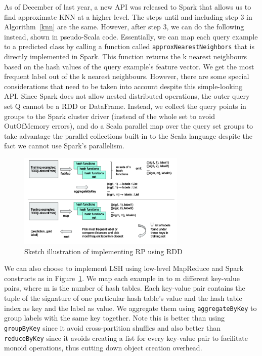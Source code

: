 \documentclass[letterpaper,twocolumn,10pt]{article}
\theoremstyle{definition}
\begin{document}
As of December of last year, a new API was released to Spark that allows us to find approximate KNN 
at a higher level. The steps until and including step 3 in Algorithm~\ref{knn} are the same. However, 
after step 3, we can do the following instead, shown in pseudo-Scala code. Essentially, we can map 
each query example to a predicted class by calling a function called \texttt{approxNearestNeighbors} 
that is directly implemented in Spark. This function returns the k nearest neighbours based on the 
hash values of the query example's feature vector. We get the most frequent label out of the k nearest 
neighbours. However, there are some special considerations that need to be 
taken into account despite this simple-looking API. Since Spark does not allow nested distributed 
operations, the outer query set Q cannot be a RDD or DataFrame. Instead, we collect the query points 
in groups to the Spark cluster driver (instead of the whole set to avoid OutOfMemory errors), and do a 
Scala parallel map over the query set groups to take advantage the parallel collections built-in to the 
Scala language despite the fact we cannot use Spark's parallelism. 


\begin{figure}[t]
	\center
	\includegraphics[width=8cm]{rdd}
	\caption{Sketch illustration of implementing RP using RDD}
	\label{figure:rdd}
\end{figure}

We can also choose to implement LSH using low-level MapReduce and Spark constructs as in 
Figure~\ref{figure:rdd}. We map each example in to m different key-value pairs, where m is the number 
of hash tables. Each key-value pair contains the tuple of the signature of one particular hash table's 
value and the hash table index as key and the label as value. We aggregate them using 
\texttt{aggregateByKey} to group labels with the same key together. Note this is better than using 
\texttt{groupByKey} since it avoid cross-partition shuffles and also better than \texttt{reduceByKey} 
since it avoids creating a list for every key-value pair to facilitate monoid operations, thus cutting down 
object creation overhead. \\
\end{document}
